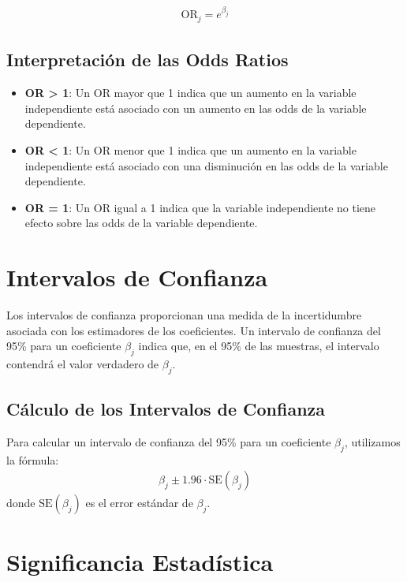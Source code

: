 \documentclass[a4paper]{report} %
\begin{document}
\begin{eqnarray*}
\text{OR}_j = e^{\beta_j}
\end{eqnarray*}

\subsection{Interpretaci\'on de las Odds Ratios}

\begin{itemize}
    \item \textbf{OR > 1}: Un OR mayor que 1 indica que un aumento en la variable independiente est\'a asociado con un aumento en las odds de la variable dependiente.
    \item \textbf{OR < 1}: Un OR menor que 1 indica que un aumento en la variable independiente est\'a asociado con una disminuci\'on en las odds de la variable dependiente.
    \item \textbf{OR = 1}: Un OR igual a 1 indica que la variable independiente no tiene efecto sobre las odds de la variable dependiente.
\end{itemize}

\section{Intervalos de Confianza}

Los intervalos de confianza proporcionan una medida de la incertidumbre asociada con los estimadores de los coeficientes. Un intervalo de confianza del 95\% para un coeficiente $\beta_j$ indica que, en el 95\% de las muestras, el intervalo contendr\'a el valor verdadero de $\beta_j$.

\subsection{C\'alculo de los Intervalos de Confianza}

Para calcular un intervalo de confianza del 95\% para un coeficiente $\beta_j$, utilizamos la f\'ormula:
\begin{eqnarray*}
\beta_j \pm 1.96 \cdot \text{SE}(\beta_j)
\end{eqnarray*}
donde $\text{SE}(\beta_j)$ es el error est\'andar de $\beta_j$.

\section{Significancia Estad\'istica}
\end{document}
